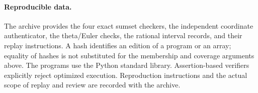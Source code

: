 \paragraph{Reproducible data.}
The archive provides the four exact sumset checkers, the independent
coordinate authenticator, the theta/Euler checks, the rational interval
records, and their replay instructions.  A hash identifies an edition
of a program or an array; equality of hashes is not substituted for the
membership and coverage arguments above.  The programs use the Python
standard library.  Assertion-based verifiers explicitly reject optimized
execution.  Reproduction instructions and the actual scope of replay
and review are recorded with the archive.
